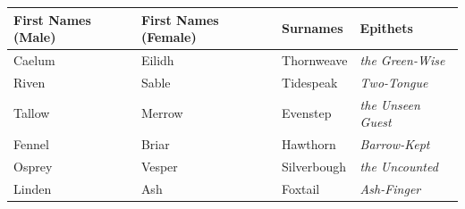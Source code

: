 \begin{longtable}{|p{}|p{}|p{}|p{}|}
\hline
\textbf{First Names (Male)} & \textbf{First Names (Female)} & \textbf{Surnames} & \textbf{Epithets} \\
\hline
Caelum & Eilidh & Thornweave & \textit{the Green-Wise} \\
\hline
Riven & Sable & Tidespeak & \textit{Two-Tongue} \\
\hline
Tallow & Merrow & Evenstep & \textit{the Unseen Guest} \\
\hline
Fennel & Briar & Hawthorn & \textit{Barrow-Kept} \\
\hline
Osprey & Vesper & Silverbough & \textit{the Uncounted} \\
\hline
Linden & Ash & Foxtail & \textit{Ash-Finger} \\
\hline
\end{longtable}

